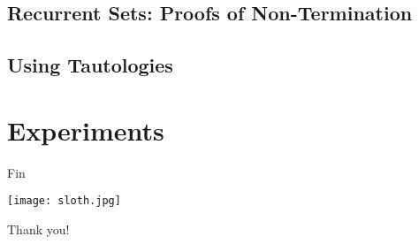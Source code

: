 \documentclass[xcolor=pdftex,t,11pt]{beamer}
\begin{document}
\subsection{Recurrent Sets: Proofs of Non-Termination}
\subsection{Using Tautologies}

\section{Experiments}

\begin{frame}[fragile]{Fin}

\begin{center}
\texttt{[image: sloth.jpg]}

\Huge
 Thank you!
\end{center}

\end{frame}
\end{document}
